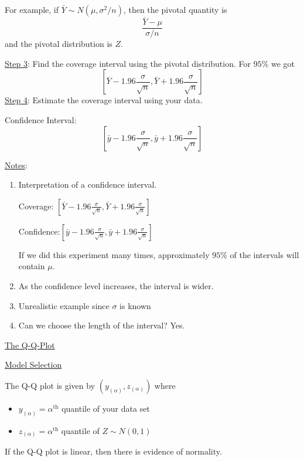 For example, if $ \bar{Y} \sim N(\mu,\sigma^2/n) $, then the pivotal
quantity is
\[ \frac{\bar{Y}-\mu}{\sigma/n} \] and the pivotal distribution is $ Z $.

\underline{Step 3}: Find the coverage interval using the pivotal distribution.
For $ 95\% $ we got
\[ \left[ \bar{Y}-1.96\frac{\sigma}{\sqrt{n}},
        \bar{Y}+1.96\frac{\sigma}{\sqrt{n}}\right] \] \underline{Step 4}: Estimate
the coverage interval using your data.

Confidence Interval:
\[ \left[ \bar{y}-1.96\frac{\sigma}{\sqrt{n}},
        \bar{y}+1.96\frac{\sigma}{\sqrt{n}}\right] \]

\underline{Notes}:
\begin{enumerate}[label=(\roman*)]
    \item Interpretation of a confidence interval.

          Coverage: $ \left[ \bar{Y}-1.96\frac{\sigma}{\sqrt{n}},
                  \bar{Y}+1.96\frac{\sigma}{\sqrt{n}}\right] $

          Confidence:$ \left[ \bar{y}-1.96\frac{\sigma}{\sqrt{n}},
                  \bar{y}+1.96\frac{\sigma}{\sqrt{n}}\right] $

          If we did this experiment many times, approximately $ 95\% $ of the
          intervals will contain $ \mu $.

    \item As the confidence level increases, the interval is wider.
    \item Unrealistic example since $ \sigma $ is known
    \item Can we choose the length of the interval? Yes.
\end{enumerate}

\underline{The Q-Q-Plot}

\underline{Model Selection}

The Q-Q plot is given by $ (y_{(\alpha)},z_{(\alpha)}) $ where
\begin{itemize}
    \item $ y_{(\alpha)} = \alpha^{\text{th}} $ quantile of your data set
    \item $ z_{(\alpha)} = \alpha^{\text{th}}  $ quantile of $ Z \sim
              N(0,1) $
\end{itemize}
If the Q-Q plot is linear, then there is evidence of normality.


